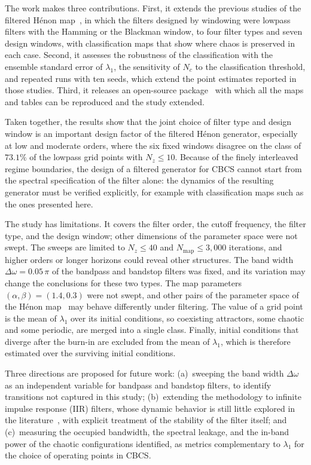 \documentclass[journal]{IEEEtran}
\begin{document}
The work makes three contributions. First, it extends the previous studies of
the filtered H\'enon map~\cite{Borges2022sbrt,BorgesCSF2022,BorgesCNSNS2024},
in which the filters designed by windowing were lowpass filters with the
Hamming or the Blackman window, to four filter types and seven design windows, with classification maps that
show where chaos is preserved in each case. Second, it assesses the robustness of
the classification with the ensemble standard error of $\lambda_1$, the
sensitivity of $N_c$ to the classification threshold, and repeated runs with
ten seeds, which extend the point estimates reported in those studies. Third, it releases an open-source package~\cite{chaoticPFC2026} with
which all the maps and tables can be reproduced and the study extended.

Taken together, the results show that the joint choice of filter type and
design window is an important design factor of the filtered H\'enon
generator, especially at low and moderate orders, where the six fixed windows
disagree on the class of $73.1\%$ of the lowpass grid points with $N_z\le10$. Because of the finely interleaved regime boundaries, the design of a
filtered generator for CBCS cannot start from the spectral specification of
the filter alone: the dynamics of the resulting generator must be verified
explicitly, for example with classification maps such as the ones presented
here.

The study has limitations. It covers the filter order, the cutoff frequency,
the filter type, and the design window; other dimensions of the parameter
space were not swept. The sweeps are limited to $N_z\le40$ and
$N_{\text{map}}\le3{,}000$ iterations, and higher orders or longer horizons
could reveal other structures. The band width $\Delta\omega=0.05\,\pi$ of the
bandpass and bandstop filters was fixed, and its variation may change the
conclusions for these two types. The map parameters $(\alpha,\beta)=(1.4,0.3)$
were not swept, and other pairs of the parameter space of the H\'enon
map~\cite{Gallas1993} may behave differently under filtering. The value of a grid
point is the mean of $\lambda_1$ over its initial conditions, so coexisting
attractors, some chaotic and some periodic, are merged into a single class.
Finally, initial
conditions that diverge after the burn-in are excluded from the mean of
$\lambda_1$, which is therefore estimated over the surviving initial
conditions.

Three directions are proposed for future work: (a)~sweeping the band width
$\Delta\omega$ as an independent variable for bandpass and bandstop filters,
to identify transitions not captured in this study; (b)~extending the
methodology to infinite impulse response (IIR) filters, whose dynamic
behavior is still little explored in the literature~\cite{Borges2024sbrt},
with explicit treatment of the stability of the filter itself; and
(c)~measuring the occupied bandwidth, the spectral leakage, and the in-band
power of the chaotic configurations identified, as metrics complementary to
$\lambda_1$ for the choice of operating points in CBCS.



\end{document}
